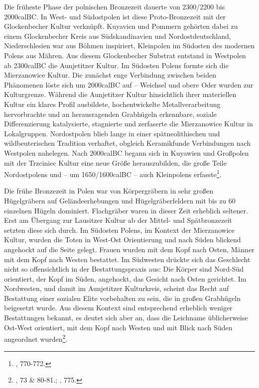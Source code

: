 \documentclass[openany,twoside,twocolumn]{book}
\let\rmarkdownfootnote\footnote%
\def\footnote{\protect\rmarkdownfootnote}
\begin{document}
Die früheste Phase der polnischen Bronzezeit dauerte von 2300/2200 bis
2000calBC. In West- und Südostpolen ist diese Proto-Bronzezeit mit der
Glockenbecher Kultur verknüpft. Kuyavien und Pommern gehörten dabei zu
einem Glockenbecher Kreis aus Südskandinavien und Nordostdeutschland,
Niederschlesien war aus Böhmen inspiriert, Kleinpolen im Südosten des
modernen Polens aus Mähren. Aus diesem Glockenbecher Substrat entstand
in Westpolen ab 2300calBC die Aunjetitzer Kultur. Im Südosten Polens
formte sich die Mierzanowice Kultur. Die zunächst enge Verbindung
zwischen beiden Phänomenen löste sich um 2000calBC auf -- Weichsel und
obere Oder wurden zur Kulturgrenze. Während die Aunjetitzer Kultur
hinsichtlich ihrer materiellen Kultur ein klares Profil ausbildete,
hochentwickelte Metallverarbeitung hervorbrachte und an herausragenden
Grabhügeln erkennbare, soziale Differenzierung katalysierte, stagnierte
und zerfaserte die Mierzanowice Kultur in Lokalgruppen. Nordostpolen
blieb lange in einer spätneolithischen und wildbeuterischen Tradition
verhaftet, obgleich Keramikfunde Verbindungen nach Westpolen nahelegen.
Nach 2000calBC begann sich in Kuyawien und Großpolen mit der Trzciniec
Kultur eine neue Größe herauszubilden, die große Teile Nordostpolens und
-- um 1650/1600calBC -- auch Kleinpolens erfasste\footnote{\textcite{czebreszuk_bronze_2013},
  770-772.}.

Die frühe Bronzezeit in Polen war von Körpergräbern in sehr großen
Hügelgräbern auf Geländeerhebungen und Hügelgräberfeldern mit bis zu 60
einzelnen Hügeln dominiert. Flachgräber waren in dieser Zeit erheblich
seltener. Erst am Übergang zur Lausitzer Kultur ab der Mittel- und
Spätbronzezeit setzten diese sich durch. Im Südosten Polens, im Kontext
der Mierzanowice Kultur, wurden die Toten in West-Ost Orientierung und
nach Süden blickend angehockt auf die Seite gelegt. Frauen wurden mit
dem Kopf nach Osten, Männer mit dem Kopf nach Westen bestattet. Im
Südwesten drückte sich das Geschlecht nicht so offensichtlich in der
Bestattungspraxis aus: Die Körper sind Nord-Süd orientiert, der Kopf im
Süden, angehockt, das Gesicht nach Osten gerichtet. Im Nordwesten, und
damit im Aunjetitzer Kulturkreis, scheint das Recht auf Bestattung einer
sozialen Elite vorbehalten zu sein, die in großen Grabhügeln beigesetzt
wurde. Aus diesem Kontext sind entsprechend erheblich weniger
Bestattungen bekannt, es deutet sich aber an, dass die Leichname
üblicherweise Ost-West orientiert, mit dem Kopf nach Westen und mit
Blick nach Süden angeordnet wurden\footnote{\textcite{dabrowski_aeltere_2004},
  73 \& 80-81.; \textcite{czebreszuk_bronze_2013}, 775.}.
\end{document}
